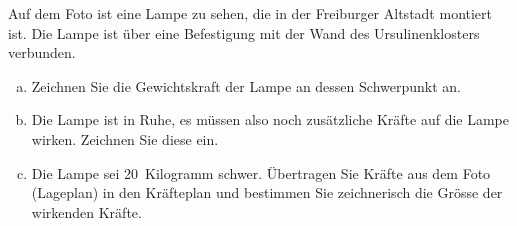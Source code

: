 
\begin{aufgabe}
	
\begin{center}
\end{center}
Auf dem Foto ist eine Lampe zu sehen, die in der Freiburger Altstadt montiert ist. Die Lampe ist über eine Befestigung mit der Wand des Ursulinenklosters
verbunden.
\begin{enumerate}[a)]
	\item Zeichnen Sie die Gewichtskraft der Lampe an dessen Schwerpunkt an.
	\item Die Lampe ist in Ruhe, es müssen also noch zusätzliche Kräfte auf die Lampe wirken. Zeichnen Sie diese ein.
	\item Die Lampe sei \SI{20}{Kilogramm} schwer. Übertragen Sie Kräfte aus dem Foto (Lageplan) in den Kräfteplan und bestimmen Sie 
		zeichnerisch die Grösse der wirkenden Kräfte.
\end{enumerate}


\end{aufgabe}

